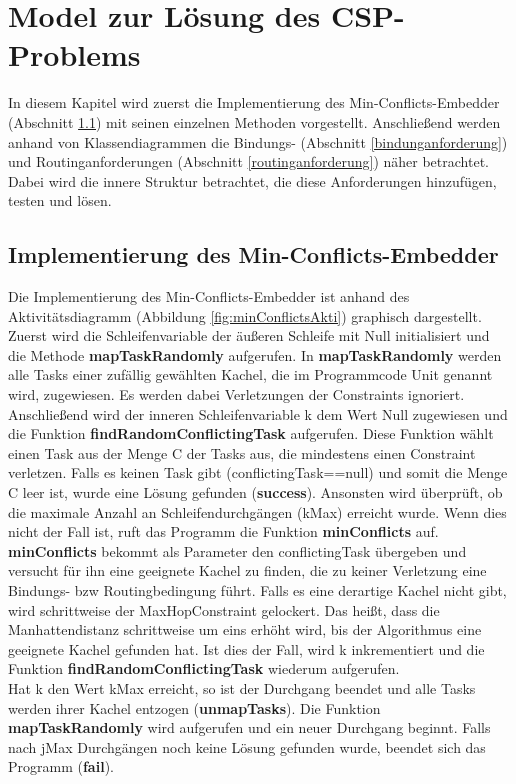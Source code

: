 \chapter{Model zur Lösung des CSP-Problems}\label{model}

In diesem Kapitel wird zuerst die Implementierung des Min-Conflicts-Embedder (Abschnitt \ref{minConflictImpl}) mit seinen einzelnen Methoden vorgestellt. Anschließend werden anhand von Klassendiagrammen die Bindungs- (Abschnitt \ref{bindunganforderung}) und Routinganforderungen (Abschnitt \ref{routinganforderung}) näher betrachtet. Dabei wird die innere Struktur betrachtet, die diese Anforderungen hinzufügen, testen und lösen.
\section{Implementierung des Min-Conflicts-Embedder}\label{minConflictImpl}

Die Implementierung des Min-Conflicts-Embedder ist anhand des Aktivitätsdiagramm (Abbildung \ref{fig:minConflictsAkti}) graphisch dargestellt. Zuerst wird die Schleifenvariable der äußeren Schleife mit Null initialisiert und die Methode \textbf{mapTaskRandomly} aufgerufen. In \textbf{mapTaskRandomly} werden alle Tasks einer zufällig gewählten Kachel, die im Programmcode Unit genannt wird, zugewiesen. Es werden dabei Verletzungen der Constraints ignoriert. Anschließend wird der inneren Schleifenvariable k dem Wert Null zugewiesen und die Funktion \textbf{findRandomConflictingTask} aufgerufen. Diese Funktion wählt einen Task aus der Menge C der Tasks aus, die mindestens einen Constraint verletzen. Falls es keinen Task gibt (conflictingTask==null) und somit die Menge C leer ist, wurde eine Lösung gefunden (\textbf{success}). Ansonsten wird überprüft, ob die maximale Anzahl an Schleifendurchgängen (kMax) erreicht wurde. Wenn dies nicht der Fall ist, ruft das Programm die Funktion \textbf{minConflicts} auf. \textbf{minConflicts} bekommt als Parameter den conflictingTask übergeben und versucht für ihn eine geeignete Kachel zu finden, die zu keiner Verletzung eine Bindungs- bzw Routingbedingung führt. Falls es eine derartige Kachel nicht gibt, wird schrittweise der MaxHopConstraint gelockert. Das heißt, dass die Manhattendistanz schrittweise um eins erhöht wird, bis der Algorithmus eine geeignete Kachel gefunden hat. Ist dies der Fall, wird k inkrementiert und die Funktion \textbf{findRandomConflictingTask} wiederum aufgerufen. \\
Hat k den Wert kMax erreicht, so ist der Durchgang beendet und alle Tasks werden ihrer Kachel entzogen (\textbf{unmapTasks}). Die Funktion \textbf{mapTaskRandomly} wird aufgerufen und ein neuer Durchgang beginnt. Falls nach jMax Durchgängen noch keine Lösung gefunden wurde, beendet sich das Programm (\textbf{fail}).

